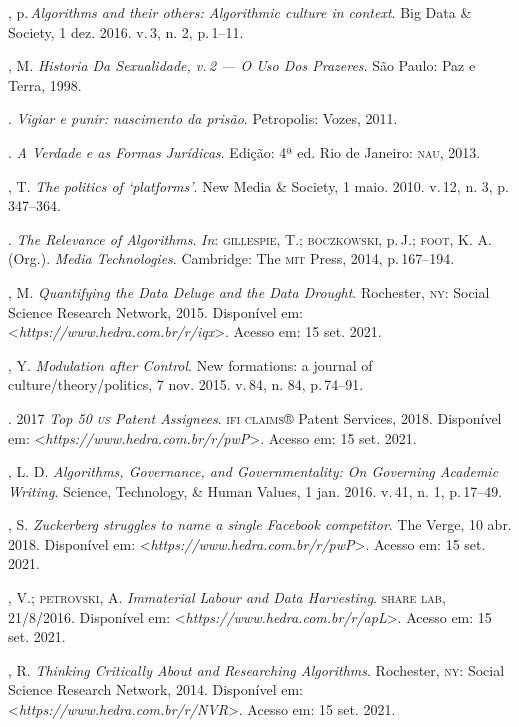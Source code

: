 \begin{bibliohedra}
, p.\,\emph{Algorithms and their others: Algorithmic culture in
context}. Big Data \& Society, 1 dez. 2016. v.\,3, n. 2, p.\,1--11.

, M. \emph{Historia Da Sexualidade, v.\,2 --- O Uso Dos Prazeres}.
São Paulo: Paz e Terra, 1998.

\titidem. \emph{Vigiar e punir: nascimento da prisão}. Petropolis:
Vozes, 2011.

\titidem. \emph{A Verdade e as Formas Jurídicas}. Edição:
4ª ed. Rio de Janeiro: \textsc{nau}, 2013.

, T. \emph{The politics of `platforms'}. New Media \&
Society, 1 maio. 2010. v.\,12, n. 3, p.\,347--364.

\titidem. \emph{The Relevance of Algorithms}. \emph{In}:
\textsc{gillespie}, T.; \textsc{boczkowski}, p.\,J.; \textsc{foot}, K. A. (Org.). \emph{Media
Technologies}. Cambridge: The \textsc{mit} Press, 2014, p.\,167--194.

, M. \emph{Quantifying the Data Deluge and the Data Drought}.
Rochester, \textsc{ny}: Social Science Research Network, 2015. Disponível em:
\textless{}\emph{https://www.hedra.com.br/r/iqx}\textgreater{}. Acesso em: 15 set. 2021.

, Y. \emph{Modulation after Control}. New formations: a journal of
culture/theory/politics, 7 nov. 2015. v.\,84, n. 84, p.\,74--91.

. 2017 \emph{Top 50 \textsc{us} Patent Assignees}. \textsc{ifi claims}® Patent
Services, 2018. Disponível em: \textless{}\emph{https://www.hedra.com.br/r/pwP}\textgreater{}. Acesso em: 15 set. 2021.

, L. D. \emph{Algorithms, Governance, and Governmentality: On
Governing Academic Writing}. Science, Technology, \& Human
Values, 1 jan. 2016. v.\,41, n. 1, p.\,17--49.

, S. \emph{Zuckerberg struggles to name a single Facebook
competitor}. The Verge, 10 abr. 2018. Disponível em: \textless{}\emph{https://www.hedra.com.br/r/pwP}\textgreater{}. Acesso em: 15 set. 2021.

, V.; \textsc{petrovski}, A. \emph{Immaterial Labour and Data Harvesting}.
\textsc{share lab}, 21/8/2016. Disponível em: \textless{}\emph{https://www.hedra.com.br/r/apL}\textgreater{}. Acesso em: 15 set. 2021.

, R. \emph{Thinking Critically About and Researching
Algorithms}. Rochester, \textsc{ny}: Social Science Research Network, 2014.
Disponível em: \textless{}\emph{https://www.hedra.com.br/r/NVR}\textgreater{}. Acesso em: 15 set. 2021.


\end{bibliohedra}
